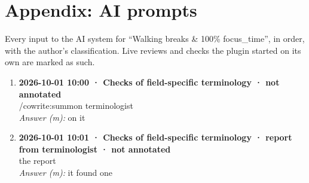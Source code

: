 \section*{Appendix: AI prompts}

Every input to the AI system for “Walking breaks \& 100\% focus\_time”, in order, with the author's classification. Live reviews and checks the plugin started on its own are marked as such.

\begin{enumerate}
  \item \textbf{2026-10-01 10:00 · Checks of field-specific terminology · not annotated} \\
  /cowrite:summon terminologist
  \\ \textit{Answer (m):} on it
  \item \textbf{2026-10-01 10:01 · Checks of field-specific terminology · report from terminologist · not annotated} \\
  the report
  \\ \textit{Answer (m):} it found one
\end{enumerate}
